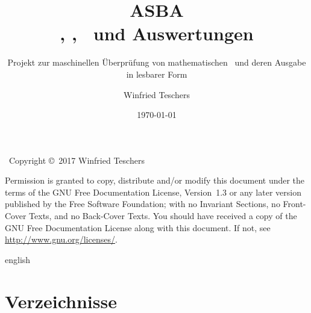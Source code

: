 \titlehead{
	{\Large Dr. Winfried Teschers}\\
	Anton-Günther-Straße 26c\\91083 Baiersdorf\\
	{\footnotesize winfried.teschers@t-online.de}
}
\subject{Projektdokument}
\title{{\Huge ASBA}\\\Axiome, \Saetze, \Beweise\ und Auswertungen}
\subtitle{Projekt zur maschinellen Überprüfung von mathematischen \Beweisen\ und deren Ausgabe in lesbarer Form}
\author{Winfried Teschers}
\date{\today}
\publishers{\vspace{1cm}\normalsize
	Es wird ein Programmsystem beschrieben, das zu eingegebenen Axiomen, Sätzen, und Beweisen letztere prüft, Auswertungen generiert und zu gegebenen Ausgabeschemata eine Ausgabe der Elemente in üblicher Formelschreibweise im \LaTeX-Format erstellt.
}



	\maketitle

	~\vfill Copyright \copyright\ 2017 Winfried Teschers\bigskip

	\begin{otherlanguage}{english}
		Permission is granted to copy, distribute and/or modify this document under the terms of the GNU Free Documentation License, Version~1.3 or any later version published by the Free Software Foundation; with no Invariant Sections, no Front-Cover Texts, and no Back-Cover Texts.
		You should have received a copy of the GNU Free Documentation License along with this document.
		If not, see \url{http://www.gnu.org/licenses/}.
	\end{otherlanguage}{english}

	\tableofcontents
	\Endchapter

	
	
	
	
	

	\chapter{Verzeichnisse}%
	\label{cha:Verzeichnisse}

